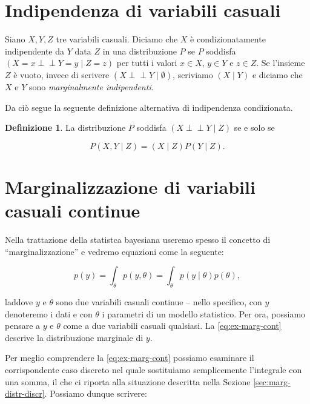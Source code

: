 \documentclass[
  11pt,
]{krantz}
\newcommand{\indep}{\perp \!\!\! \perp}
\theoremstyle{definition}
\newtheorem{definition}{Definizione}[chapter]
\theoremstyle{definition}
\theoremstyle{definition}
\theoremstyle{definition}
\theoremstyle{remark}
\begin{document}
\hypertarget{indipendenza-di-variabili-casuali}{%
\section{Indipendenza di variabili casuali}\label{indipendenza-di-variabili-casuali}}

Siano \(X, Y, Z\) tre variabili casuali. Diciamo che \(X\) è condizionatamente indipendente da \(Y\) data \(Z\) in una distribuzione \(P\) se \(P\) soddisfa \((X=x \indep Y=y \mid Z=z)\) per tutti i valori \(x \in X\), \(y \in Y\) e \(z \in Z\). Se l'insieme \(Z\) è vuoto, invece di scrivere \((X \indep Y \mid \emptyset)\), scriviamo \((X \mid Y)\) e diciamo che \(X\) e \(Y\) sono \emph{marginalmente indipendenti}.

Da ciò segue la seguente definizione alternativa di indipendenza condizionata.

\begin{definition}
La distribuzione \(P\) soddisfa \((X \indep Y \mid Z)\) se e solo se

\[
P(X, Y \mid Z) = (X \mid Z)P(Y \mid Z).
\]
\end{definition}

\hypertarget{sec:margin-vc-cont}{%
\section{Marginalizzazione di variabili casuali continue}\label{sec:margin-vc-cont}}

Nella trattazione della statistca bayesiana useremo spesso il concetto di ``marginalizzazione'' e vedremo equazioni come la seguente:

\begin{equation}
p(y) = \int_{\theta} p(y, \theta) = \int_{\theta} p(y \mid \theta) p(\theta),
\label{eq:ex-marg-cont}
\end{equation}

laddove \(y\) e \(\theta\) sono due variabili casuali continue -- nello specifico, con \(y\) denoteremo i dati e con \(\theta\) i parametri di un modello statistico. Per ora, possiamo pensare a \(y\) e \(\theta\) come a due variabili casuali qualsiasi. La \eqref{eq:ex-marg-cont} descrive la distribuzione marginale di \(y\).

Per meglio comprendere la \eqref{eq:ex-marg-cont} possiamo esaminare il corrispondente caso discreto nel quale sostituiamo semplicemente l'integrale con una somma, il che ci riporta alla situazione descritta nella Sezione \ref{sec:marg-distr-discr}. Possiamo dunque scrivere:
\end{document}
